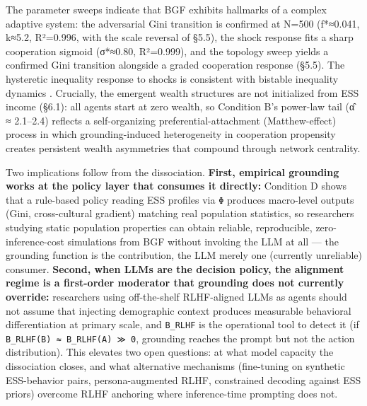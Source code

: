
The parameter sweeps indicate that BGF exhibits hallmarks of a complex adaptive system: the adversarial Gini transition is confirmed at N=500 (f*≈0.041, k≈5.2, R²=0.996, with the scale reversal of §5.5), the shock response fits a sharp cooperation sigmoid (σ*≈0.80, R²=0.999), and the topology sweep yields a confirmed Gini transition alongside a graded cooperation response (§5.5). The hysteretic inequality response to shocks is consistent with bistable inequality dynamics \cite{Piketty2014, AcemogluRobinson2012}. Crucially, the emergent wealth structures are not initialized from ESS income (§6.1): all agents start at zero wealth, so Condition B's power-law tail (α̂ ≈ 2.1–2.4) reflects a self-organizing preferential-attachment (Matthew-effect) process in which grounding-induced heterogeneity in cooperation propensity creates persistent wealth asymmetries that compound through network centrality.


Two implications follow from the dissociation. \textbf{First, empirical grounding works at the policy layer that consumes it directly:} Condition D shows that a rule-based policy reading ESS profiles via \texttt{Φ} produces macro-level outputs (Gini, cross-cultural gradient) matching real population statistics, so researchers studying static population properties can obtain reliable, reproducible, zero-inference-cost simulations from BGF without invoking the LLM at all — the grounding function is the contribution, the LLM merely one (currently unreliable) consumer. \textbf{Second, when LLMs are the decision policy, the alignment regime is a first-order moderator that grounding does not currently override:} researchers using off-the-shelf RLHF-aligned LLMs as agents should not assume that injecting demographic context produces measurable behavioral differentiation at primary scale, and \texttt{B\_RLHF} is the operational tool to detect it (if \texttt{B\_RLHF(B) ≈ B\_RLHF(A) ≫ 0}, grounding reaches the prompt but not the action distribution). This elevates two open questions: at what model capacity the dissociation closes, and what alternative mechanisms (fine-tuning on synthetic ESS-behavior pairs, persona-augmented RLHF, constrained decoding against ESS priors) overcome RLHF anchoring where inference-time prompting does not.


